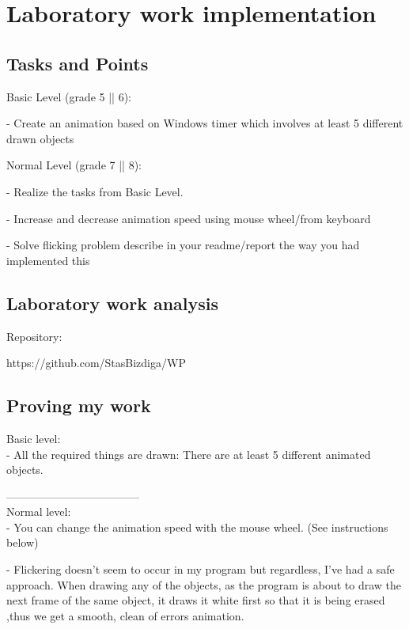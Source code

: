 \section{Laboratory work implementation}

\subsection{Tasks and Points}


Basic Level (grade 5 || 6):

-    Create an animation based on Windows timer which involves at least 5 different drawn objects

Normal Level (grade 7 || 8):

-    Realize the tasks from Basic Level.

- 	 Increase and decrease animation speed using mouse wheel/from keyboard

- 	 Solve flicking problem describe in your readme/report the way you had implemented this





\subsection{Laboratory work analysis}
Repository:

https://github.com/StasBizdiga/WP

\subsection{Proving my work}

Basic level: \\

- All the required things are drawn: There are at least 5 different animated objects.

------------------------------------ \\

Normal level: \\

- You can change the animation speed with the mouse wheel. (See instructions below)

- Flickering doesn't seem to occur in my program but regardless, I've had a safe approach. When drawing any of the objects, as the program is about to draw the next frame of the same object, it draws it white first so that it is being erased ,thus we get a smooth, clean of errors animation.



